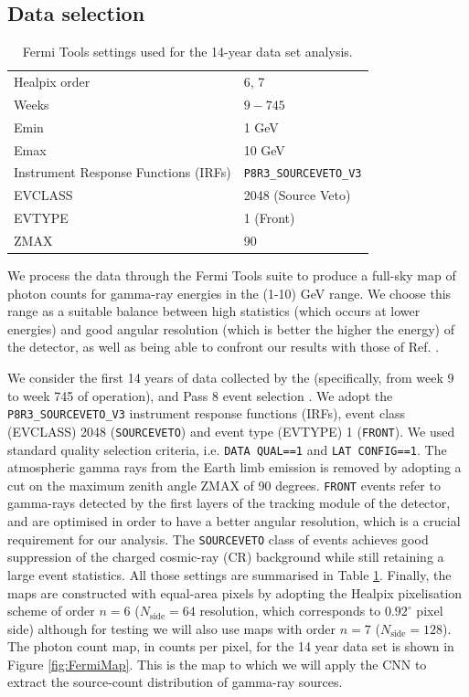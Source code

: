 \subsection{Data selection}
\label{sec:dataselection}

\begin{table}[t]
\centering
\begin{tabular}{ | l| l|  }
\hline
Healpix order & 6, 7  \\ 
Weeks & $9-745$  \\ 
Emin & 1 GeV \\
Emax & 10 GeV \\
Instrument Response Functions (IRFs) & \verb|P8R3_SOURCEVETO_V3| \\
EVCLASS & 2048 (Source Veto)  \\ 
EVTYPE & 1 (Front)  \\
ZMAX & 90 \\
\hline
\end{tabular}
\caption{Fermi Tools settings used for the 14-year data set analysis. }
\label{tab:dnds:settings}
\end{table}

We process the \fermi data through the Fermi Tools suite \cite{Fermitools} to produce a full-sky map of photon counts for gamma-ray energies in the (1-10) GeV  range. We choose this range as a suitable balance between high statistics (which occurs at lower energies) and good angular resolution (which is better the higher the energy) of the detector, as well as being able to confront our results with those of Ref. \cite{Cuoco-1pdf}.

We consider the first 14 years of data collected by the \fermi (specifically, from week 9 to week 745 of operation), and Pass 8 event selection \cite{Fermi-LAT:2013jgq,Bruel:2018lac}. We adopt the \verb|P8R3_SOURCEVETO_V3| instrument response functions (IRFs), event class (EVCLASS) 2048 (\texttt{SOURCEVETO}) and event type (EVTYPE) 1 (\verb|FRONT|). We used standard quality selection criteria, i.e. \verb|DATA QUAL==1| and
\verb|LAT CONFIG==1|.
The atmospheric gamma rays from the Earth limb emission is removed by adopting a cut
on the maximum zenith angle ZMAX of 90 degrees.
\verb|FRONT| events refer to gamma-rays detected by the first layers of the tracking module of the \fermi detector, and are optimised in order to have a better angular resolution, which is a crucial requirement for our analysis. 
The \texttt{SOURCEVETO} class of events achieves good suppression of the charged cosmic-ray (CR) background while still retaining a large event statistics. All those settings are summarised in Table \ref{tab:dnds:settings}. Finally, the maps are constructed with equal-area pixels by adopting the Healpix \cite{healpix} pixelisation scheme of order $n=6$ ($N_\textrm{side} = 64$ resolution, which corresponds to $0.92^\circ$ pixel side) although for testing we will also use maps with order $n=7$ ($N_\textrm{side} = 128$).  
The photon count map, in counts per pixel, for the 14 year data set is shown in Figure \ref{fig:FermiMap}. This is the map to which we will apply the CNN to extract the source-count distribution of gamma-ray sources. 

